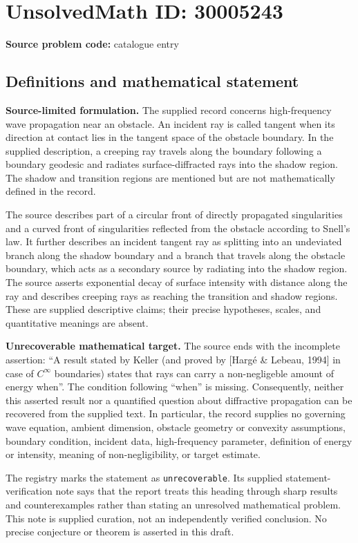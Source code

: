 \documentclass[11pt]{article}
\begin{document}
\section*{UnsolvedMath ID: 30005243}
\textbf{Source problem code:} catalogue entry
\subsection{Definitions and mathematical statement}
\textbf{Source-limited formulation.} The supplied record concerns high-frequency wave propagation near an obstacle. An incident ray is called tangent when its direction at contact lies in the tangent space of the obstacle boundary. In the supplied description, a creeping ray travels along the boundary following a boundary geodesic and radiates surface-diffracted rays into the shadow region. The shadow and transition regions are mentioned but are not mathematically defined in the record.

The source describes part of a circular front of directly propagated singularities and a curved front of singularities reflected from the obstacle according to Snell's law. It further describes an incident tangent ray as splitting into an undeviated branch along the shadow boundary and a branch that travels along the obstacle boundary, which acts as a secondary source by radiating into the shadow region. The source asserts exponential decay of surface intensity with distance along the ray and describes creeping rays as reaching the transition and shadow regions. These are supplied descriptive claims; their precise hypotheses, scales, and quantitative meanings are absent.

\textbf{Unrecoverable mathematical target.} The source ends with the incomplete assertion: ``A result stated by Keller (and proved by [Harg\'e \& Lebeau, 1994] in case of $C^\infty$ boundaries) states that rays can carry a non-negligeble amount of energy when''. The condition following ``when'' is missing. Consequently, neither this asserted result nor a quantified question about diffractive propagation can be recovered from the supplied text. In particular, the record supplies no governing wave equation, ambient dimension, obstacle geometry or convexity assumptions, boundary condition, incident data, high-frequency parameter, definition of energy or intensity, meaning of non-negligibility, or target estimate.

The registry marks the statement as \texttt{unrecoverable}. Its supplied statement-verification note says that the report treats this heading through sharp results and counterexamples rather than stating an unresolved mathematical problem. This note is supplied curation, not an independently verified conclusion. No precise conjecture or theorem is asserted in this draft.
\end{document}
